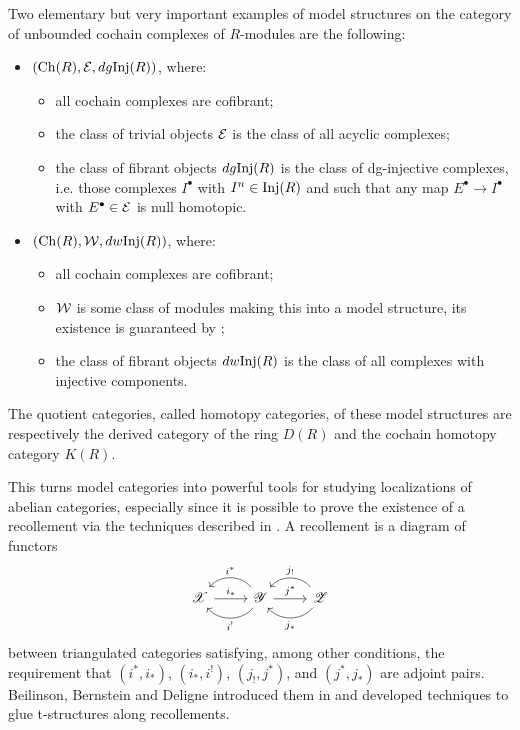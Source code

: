 Two elementary but very important examples of model structures on the category of unbounded cochain complexes of $R$-modules are the following:
\begin{itemize}
  \item $(\mathrm{Ch}(R),\mathcal{E},dg \mathrm{Inj}(R))$, where:
    \begin{itemize}
      \item all cochain complexes are cofibrant;
      \item the class of trivial objects $\mathcal{E}$ is the class of all acyclic complexes;
      \item the class of fibrant objects $dg \mathrm{Inj}(R)$ is the class of dg-injective complexes, i.e. those complexes $I^\bullet$ with $I^n\in\mathrm{Inj}(R)$ and such that any map $E^\bullet \to I^\bullet$ with $E^\bullet\in\mathcal{E}$ is null homotopic.
    \end{itemize}
  \item $(\mathrm{Ch}(R),\mathcal{W},dw \mathrm{Inj}(R))$, where:
    \begin{itemize}
      \item all cochain complexes are cofibrant;
      \item $\mathcal{W}$ is some class of modules making this into a model structure, its existence is guaranteed by \cite{G4};
      \item the class of fibrant objects $dw \mathrm{Inj}(R)$ is the class of all complexes with injective components.
    \end{itemize}
\end{itemize}

The quotient categories, called homotopy categories, of these model structures are respectively the derived category of the ring $D(R)$ and the cochain homotopy category $K(R)$.

This turns model categories into powerful tools for studying localizations of abelian categories, especially since it is possible to prove the existence of a recollement via the techniques described in \cite{G7}. A recollement is a diagram of functors
\begin{equation*}
  \begin{tikzcd}
    \mathscr{X}\arrow{r}{i_\ast}
    & \mathscr{Y}\arrow[bend left=50]{l}{i^!}\arrow[bend right=50]{l}[']{i^\ast}\arrow{r}{j^\ast}
    & \mathscr{Z}\arrow[bend left=50]{l}{j_\ast}\arrow[bend right=50]{l}[']{j_!}
  \end{tikzcd}
\end{equation*}
between triangulated categories satisfying, among other conditions, the requirement that $(i^\ast,i_\ast)$, $(i_\ast,i^!)$, $(j_!,j^\ast)$, and $(j^\ast,j_\ast)$ are adjoint pairs. Beilinson, Bernstein and Deligne introduced them in \cite{bbd82} and developed techniques to glue t-structures along recollements.


